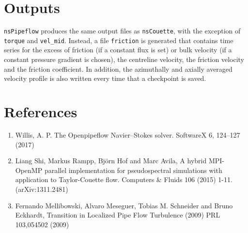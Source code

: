 \documentclass[11pt,a4paper]{article}
\begin{document}
\section{Outputs}

\verb+nsPipeflow+ produces the same output files as \verb+nsCouette+,
with the exception of \verb+torque+ and \verb+vel_mid+. Instead,
a file \verb+friction+ is generated that contains time series
for the excess of friction (if a constant flux is set) or bulk velocity
(if a constant pressure gradient is chosen), the centreline velocity,
the friction velocity and the friction coefficient. In addition,
the azimuthally and axially averaged velocity profile is also written
every time that a checkpoint is saved. 



\section*{References}
\begin{enumerate}
\item Willis, A. P. The Openpipeflow Navier–Stokes solver. SoftwareX 6, 124–127 (2017)
\item Liang Shi, Markus Rampp, Bj\"orn Hof and Marc Avila, A hybrid MPI-OpenMP parallel implementation for
  pseudospectral simulations with application to Taylor-Couette
  flow. Computers \& Fluids 106 (2015) 1-11. (arXiv:1311.2481)
\item Fernando Mellibowski, Alvaro Meseguer, Tobias M. Schneider and Bruno Eckhardt,
  Transition in Localized Pipe Flow Turbulence (2009) PRL
  103,054502 (2009)
\end{enumerate}
\end{document}
